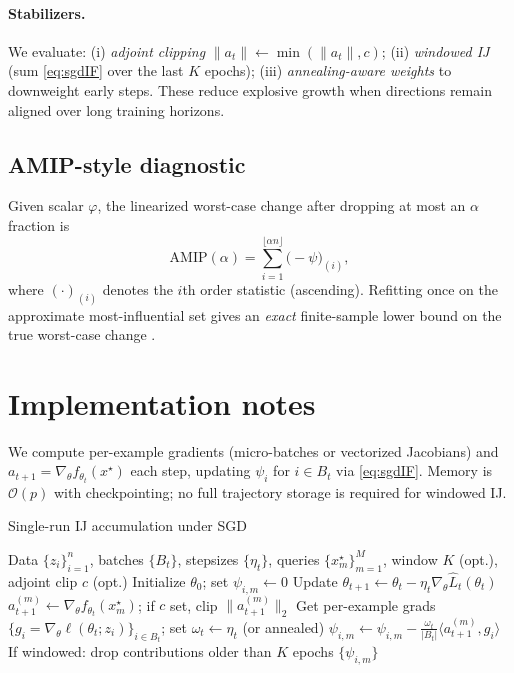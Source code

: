 \documentclass[11pt]{article}
\begin{document}
\paragraph{Stabilizers.}
We evaluate: (i) \emph{adjoint clipping} $\|a_t\|\!\leftarrow\!\min(\|a_t\|,c)$; (ii) \emph{windowed IJ} (sum \eqref{eq:sgdIF} over the last $K$ epochs); (iii) \emph{annealing-aware weights} to downweight early steps. These reduce explosive growth when directions remain aligned over long training horizons.

\subsection{AMIP-style diagnostic}
Given scalar $\varphi$, the linearized worst-case change after dropping at most an $\alpha$ fraction is
\[
\mathrm{AMIP}(\alpha)=\sum_{i=1}^{\lfloor \alpha n\rfloor}\big(-\psi\big)_{(i)},
\]
where $(\cdot)_{(i)}$ denotes the $i$th order statistic (ascending). Refitting once on the approximate most-influential set gives an \emph{exact} finite-sample lower bound on the true worst-case change \citep{broderick2023amip}.

\section{Implementation notes}
We compute per-example gradients (micro-batches or vectorized Jacobians) and $a_{t+1}=\nabla_\theta f_{\theta_t}(x^\star)$ each step, updating $\psi_i$ for $i\in B_t$ via \eqref{eq:sgdIF}. Memory is $\mathcal{O}(p)$ with checkpointing; no full trajectory storage is required for windowed IJ.

\begin{algorithm}[t]
\caption{Single-run IJ accumulation under SGD}
\label{alg:ij-sgd}
\begin{algorithmic}[1]
\Require Data $\{z_i\}_{i=1}^n$, batches $\{B_t\}$, stepsizes $\{\eta_t\}$, queries $\{x^\star_m\}_{m=1}^M$, window $K$ (opt.), adjoint clip $c$ (opt.)
\State Initialize $\theta_0$; set $\psi_{i,m}\gets 0$
  \State Update $\theta_{t+1}\gets \theta_t-\eta_t\nabla_\theta \widehat{L}_t(\theta_t)$
    \State $a^{(m)}_{t+1}\gets \nabla_\theta f_{\theta_t}(x^\star_m)$; if $c$ set, clip $\|a^{(m)}_{t+1}\|_2$
  \EndFor
  \State Get per-example grads $\{g_i=\nabla_\theta \ell(\theta_t;z_i)\}_{i\in B_t}$; set $\omega_t\gets \eta_t$ (or annealed)
     \State $\psi_{i,m}\gets \psi_{i,m}-\frac{\omega_t}{|B_t|}\langle a^{(m)}_{t+1}, g_i\rangle$
  \EndFor\EndFor
  \State If windowed: drop contributions older than $K$ epochs
\EndFor
\State \Return $\{\psi_{i,m}\}$
\end{algorithmic}
\end{algorithm}
\end{document}
